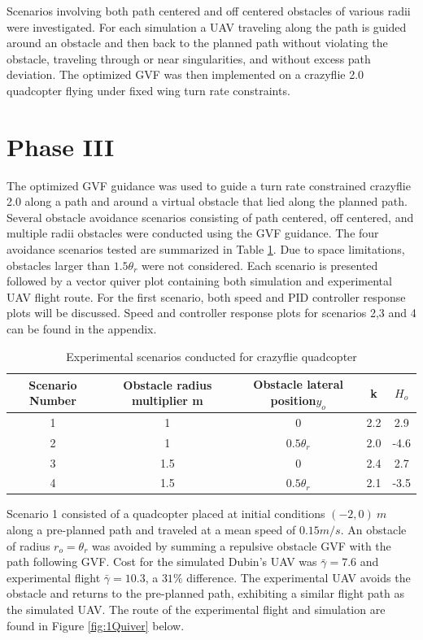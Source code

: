 \documentclass[numbered,pdftex]{ohio-etd}
\begin{document}
Scenarios involving both path centered and off centered obstacles of various radii were investigated. For each simulation a UAV traveling along the path is guided around an obstacle and then back to the planned path without violating the obstacle, traveling through or near singularities, and without excess path deviation. The optimized GVF was then implemented on a crazyflie 2.0 quadcopter flying under fixed wing turn rate constraints. 



\section{Phase III}

The optimized GVF guidance was used to guide a turn rate constrained crazyflie 2.0 along a path and around a virtual obstacle that lied along the planned path. Several obstacle avoidance scenarios consisting of path centered, off centered, and multiple radii obstacles were conducted using the GVF guidance. The four avoidance scenarios tested are summarized in Table \ref{table:flightScenarios}. Due to space limitations, obstacles larger than $1.5 \theta_r$ were not considered. Each scenario is presented followed by a vector quiver plot containing both simulation and experimental UAV flight route. For the first scenario, both speed and PID controller response plots will be discussed. Speed and controller response plots for scenarios 2,3 and 4 can be found in the appendix. 


\begin{table}[H]
	\centering
	\caption{Experimental scenarios conducted for crazyflie quadcopter}
	\label{table:flightScenarios}
	\begin{tabular}{|c|c|c|c|c|}
		\hline
		Scenario Number & Obstacle radius multiplier m   & Obstacle lateral position$y_o$             & k   & $H_o$ \\ \hline
		1               & 1   & 0              & 2.2 & 2.9   \\ \hline
		2               & 1   & $0.5 \theta_r$ & 2.0 & -4.6  \\ \hline
		3               & 1.5 & 0              & 2.4 & 2.7   \\ \hline
		4               & 1.5 & $0.5 \theta_r$ & 2.1 & -3.5  \\ \hline
	\end{tabular}
\end{table}


Scenario 1 consisted of a quadcopter placed at initial conditions $(-2,0) \ m$ along a pre-planned path and traveled at a mean speed of $0.15 m/s$. An obstacle of radius $r_o = \theta_r$ was avoided by summing a repulsive obstacle GVF with the path following GVF. Cost for the simulated Dubin's UAV was $\bar{\gamma} = 7.6$ and experimental flight $\bar{\gamma} = 10.3$, a $31 \%$ difference. The experimental UAV avoids the obstacle and returns to the pre-planned path, exhibiting a similar flight path as the simulated UAV. The route of the experimental flight and simulation are found in Figure \ref{fig:1Quiver} below.
\end{document}
